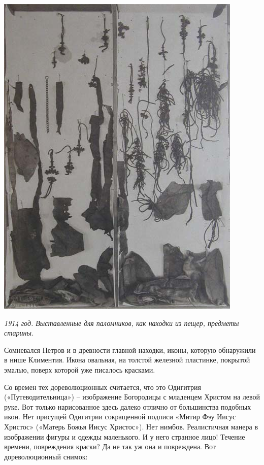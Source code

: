 \begin{center}
\includegraphics[width=\linewidth]{chast-colebanie-osnov/nachalo/zver-pred.jpg}
\end{center}

\textit{1914 год. Выставленные для паломников, как находки из пещер, предметы старины.}

Сомневался Петров и в древности главной находки, иконы, которую обнаружили в нише Климентия. Икона овальная, на толстой железной пластинке, покрытой эмалью, поверх которой уже писалось красками.


Со времен тех дореволюционных считается, что это Одигитрия («Путеводительница») – изображение Богородицы с младенцем Христом на левой руке. Вот только нарисованное здесь далеко отлично от большинства подобных икон. Нет присущей Одигитрии сокращенной подписи «Митир Фэу Иисус Христос» («Матерь Божья Иисус Христос»). Нет нимбов. Реалистичная манера в изображении фигуры и одежды маленького. И у него странное лицо! Течение времени, повреждения краски? Да не так уж она и повреждена. Вот дореволюционный снимок:

